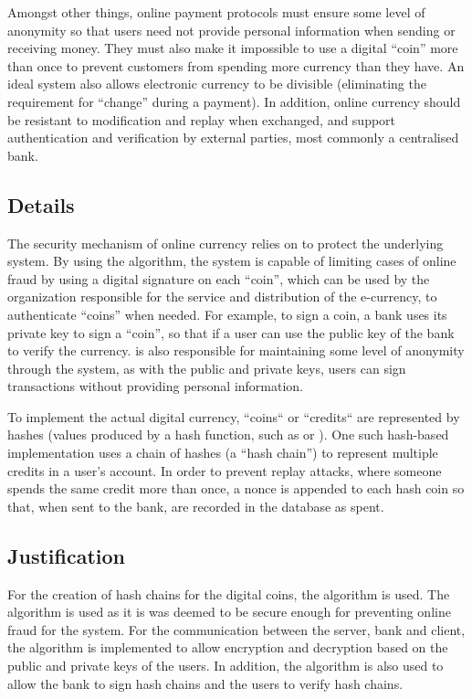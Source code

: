 \documentclass[a4paper,11pt]{article}
\begin{document}
Amongst other things, online payment protocols must ensure some level of 
anonymity so that users need not provide personal information when sending or 
receiving money. They must also make it impossible to use a digital ``coin'' 
more than once to prevent customers from spending more currency than they have.
An ideal system also allows electronic currency to be divisible (eliminating the
requirement for ``change'' during a payment). In addition, online currency 
should be resistant to modification and replay when exchanged, and support 
authentication and verification by external parties, most commonly a centralised
bank.

\subsection{Details}
The security mechanism of online currency relies on  to protect the underlying system. By using the  
algorithm, the system is capable of limiting cases of online fraud by using a 
digital signature on each ``coin'', which can be used by the organization 
responsible for the service and distribution of the e-currency, to authenticate 
``coins'' when needed. For example, to sign a coin, a bank uses its private key 
to sign a ``coin'', so that if a user can use the public key of the bank to 
verify the currency.  is also responsible for maintaining some 
level of anonymity through the system, as with the public and private keys, 
users can sign transactions without providing personal information.

To implement the actual digital currency, ``coins`` or ``credits`` are 
represented by hashes (values produced by a hash function, such as 
 or ). One such hash-based implementation 
uses a chain of hashes (a ``hash chain'') to represent multiple credits in a 
user's account. In order to prevent replay attacks, where someone spends the 
same credit more than once, a nonce is appended to each hash coin so that, when 
sent to the bank, are recorded in the database as spent.

\subsection{Justification}
For the creation of hash chains for the digital coins, the  
algorithm is used. The  algorithm is used as it is was deemed to 
be secure enough for preventing online fraud for the system. For the 
communication between the server, bank and client, the  algorithm
is implemented to allow encryption and decryption based on the public and private 
keys of the users. In addition, the  algorithm is also used to 
allow the bank to sign hash chains and the users to verify hash chains.
\end{document}
